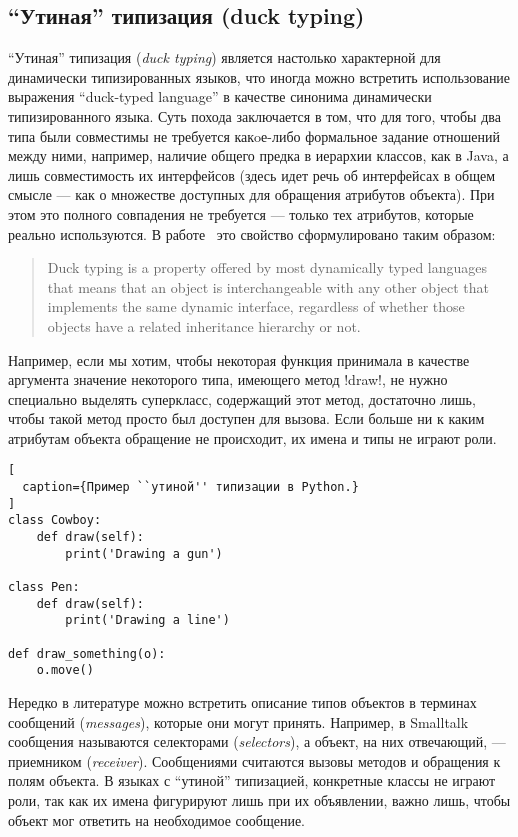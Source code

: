 \subsection{``Утиная'' типизация (duck typing)}

``Утиная'' типизация (\emph{duck typing}) является настолько характерной для
динамически типизированных языков, что иногда можно встретить использование
выражения ``duck-typed language'' в качестве синонима динамически
типизированного языка. Суть похода заключается в том, что для того, чтобы два
типа были совместимы не требуется какoе-либо формальное задание отношений между
ними, например, наличие общего предка в иерархии классов, как в Java, а лишь
совместимость их интерфейсов (здесь идет речь об интерфейсах в общем смысле ---
как о множестве доступных для обращения атрибутов объекта). При этом это полного
совпадения не требуется --- только тех атрибутов, которые реально используются.
В работе~\cite{Ortin2011:union} это свойство сформулировано таким образом:

\begin{quote}
    Duck typing is a property offered by most dynamically typed
    languages that means that an object is interchangeable with any other
    object that implements the same dynamic interface, regardless of whether
    those objects have a related inheritance hierarchy or not.
\end{quote}

Например, если мы хотим, чтобы некоторая функция принимала в качестве аргумента
значение некоторого типа, имеющего метод !draw!, не нужно специально выделять
суперкласс, содержащий этот метод, достаточно лишь, чтобы такой метод просто был
доступен для вызова. Если больше ни к каким атрибутам объекта обращение не
происходит, их имена и типы не играют роли. 

\begin{lstlisting}[
  caption={Пример ``утиной'' типизации в Python.}
]
class Cowboy:
    def draw(self):
        print('Drawing a gun')

class Pen:
    def draw(self):
        print('Drawing a line')

def draw_something(o):
    o.move()
\end{lstlisting}

Нередко в литературе можно встретить описание типов объектов в терминах
сообщений (\emph{messages}), которые они могут принять. Например, в Smalltalk
сообщения называются селекторами (\emph{selectors}), а объект, на них отвечающий, ---
приемником (\emph{receiver}). Сообщениями считаются вызовы методов и обращения к полям
объекта. В языках с ``утиной'' типизацией, конкретные классы не играют роли, так
как их имена фигурируют лишь при их объявлении, важно лишь, чтобы объект мог
ответить на необходимое сообщение.  

